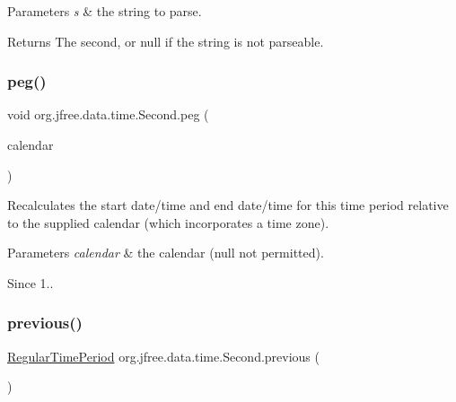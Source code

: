 \begin{DoxyParams}{Parameters}
{\em s} & the string to parse.\\
\hline
\end{DoxyParams}
\begin{DoxyReturn}{Returns}
The second, or {\ttfamily null} if the string is not parseable. 
\end{DoxyReturn}
\mbox{\label{classorg_1_1jfree_1_1data_1_1time_1_1_second_a417846010aa3a4fd29e215dfcc0690a9}} 
\subsubsection{\texorpdfstring{peg()}{peg()}}
{\footnotesize\ttfamily void org.\+jfree.\+data.\+time.\+Second.\+peg (\begin{DoxyParamCaption}\item[{Calendar}]{calendar }\end{DoxyParamCaption})}

Recalculates the start date/time and end date/time for this time period relative to the supplied calendar (which incorporates a time zone).


\begin{DoxyParams}{Parameters}
{\em calendar} & the calendar ({\ttfamily null} not permitted).\\
\hline
\end{DoxyParams}
\begin{DoxySince}{Since}
1.. 
\end{DoxySince}
\mbox{\label{classorg_1_1jfree_1_1data_1_1time_1_1_second_aa0505f770b81ea0a466971bec8becf35}} 
\subsubsection{\texorpdfstring{previous()}{previous()}}
{\footnotesize\ttfamily \mbox{\hyperlink{classorg_1_1jfree_1_1data_1_1time_1_1_regular_time_period}{Regular\+Time\+Period}} org.\+jfree.\+data.\+time.\+Second.\+previous (\begin{DoxyParamCaption}{ }\end{DoxyParamCaption})}

